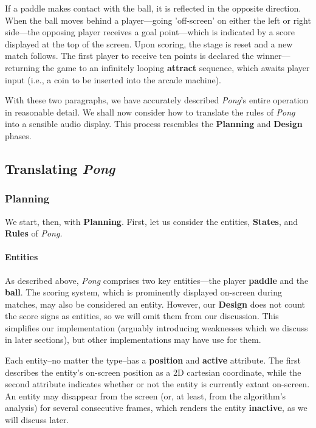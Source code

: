 \documentclass{report}
\newcommand{\plan}{\textbf{Planning}\xspace}
\newcommand{\design}{\textbf{Design}\xspace}
\newcommand{\state}[1]{\textbf{#1}}
\newcommand{\rules}{\textbf{Rules}\xspace}
\newcommand{\pad}{\textbf{paddle}\xspace}
\newcommand{\ball}{\textbf{ball}\xspace}
\begin{document}
If a paddle makes contact with the ball, it is reflected in the opposite direction. When the ball moves behind a player---going 'off-screen' on either the left or right side---the opposing player receives a goal point---which is indicated by a score displayed at the top of the screen. Upon scoring, the stage is reset and a new match follows. The first player to receive ten points is declared the winner---returning the game to an infinitely looping \state{attract} sequence, which awaits player input (i.e., a coin to be inserted into the arcade machine).

With these two paragraphs, we have accurately described \emph{Pong}'s entire operation in reasonable detail. We shall now consider how to translate the rules of \emph{Pong} into a sensible audio display. This process resembles the \plan and \design phases.

\subsection{Translating \emph{Pong}}
\subsubsection{Planning}
We start, then, with \plan. First, let us consider the entities, \state{States}, and \rules of \emph{Pong.}

\paragraph{Entities}

As described above, \emph{Pong} comprises two key entities---the player \pad and the \ball.
The scoring system, which is prominently displayed on-screen during matches, may also be considered an entity. However, our \design does not count the score signs as entities, so we will omit them from our discussion. This simplifies our implementation (arguably introducing weaknesses which we discuss in later sections), but other implementations may have use for them. 

Each entity--no matter the type--has a \state{position} and \state{active} attribute. The first describes the entity's on-screen position as a 2D cartesian coordinate, while the second attribute indicates whether or not the entity is currently extant on-screen. An entity may disappear from the screen (or, at least, from the algorithm's analysis) for several consecutive frames, which renders the entity \state{inactive}, as we will discuss later.
\end{document}
